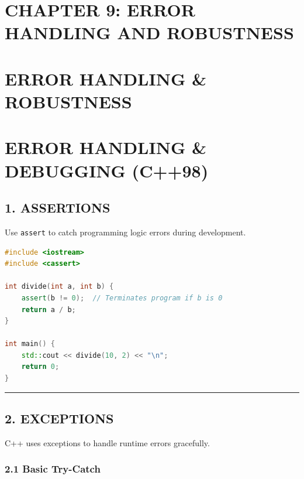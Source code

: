 \hypertarget{chapter-9-error-handling-and-robustness}{%
\section{CHAPTER 9: ERROR HANDLING AND
ROBUSTNESS}\label{chapter-9-error-handling-and-robustness}}

\hypertarget{error-handling-robustness}{%
\section{ERROR HANDLING \& ROBUSTNESS}\label{error-handling-robustness}}

\hypertarget{error-handling-debugging-c98}{%
\section{ERROR HANDLING \& DEBUGGING
(C++98)}\label{error-handling-debugging-c98}}

\hypertarget{assertions}{%
\subsection{1. ASSERTIONS}\label{assertions}}

Use \passthrough{\lstinline!assert!} to catch programming logic errors
during development.

\begin{lstlisting}[language={C++}]
#include <iostream>
#include <cassert>

int divide(int a, int b) {
    assert(b != 0);  // Terminates program if b is 0
    return a / b;
}

int main() {
    std::cout << divide(10, 2) << "\n";
    return 0;
}
\end{lstlisting}

\begin{center}\rule{0.5\linewidth}{0.5pt}\end{center}

\hypertarget{exceptions}{%
\subsection{2. EXCEPTIONS}\label{exceptions}}

C++ uses exceptions to handle runtime errors gracefully.

\hypertarget{basic-try-catch}{%
\subsubsection{2.1 Basic Try-Catch}\label{basic-try-catch}}

